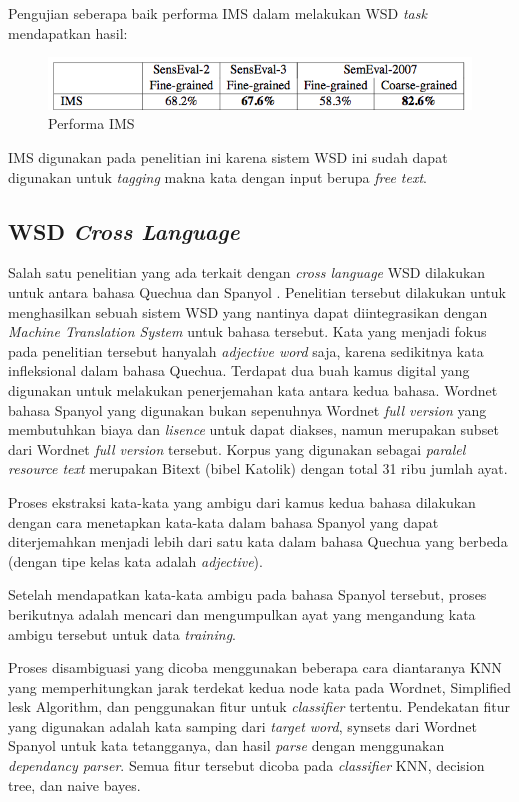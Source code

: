 Pengujian seberapa baik performa IMS dalam melakukan  WSD \textit{task} mendapatkan hasil:

\begin{figure}
	\centering
	\includegraphics[width=1\linewidth]{adit_pics/Performa-IMS}
	\caption{Performa IMS \citep{zhong2010makes}}
	\label{fig:Performa-IMS}
\end{figure}

IMS digunakan pada penelitian ini karena sistem WSD ini sudah dapat digunakan untuk \textit{tagging} makna kata dengan input berupa \textit{free text}.

\subsection{WSD \textit{Cross Language}}

Salah satu penelitian yang ada terkait dengan \textit{cross language} WSD dilakukan untuk antara bahasa Quechua dan Spanyol \citep{rudnick2011towards}. Penelitian tersebut dilakukan untuk menghasilkan sebuah sistem WSD yang nantinya dapat diintegrasikan dengan \textit{Machine Translation System} untuk bahasa tersebut. Kata yang menjadi fokus pada penelitian tersebut hanyalah \textit{adjective word} saja, karena sedikitnya kata infleksional dalam bahasa Quechua. Terdapat dua buah kamus digital yang digunakan untuk melakukan penerjemahan kata antara kedua bahasa. Wordnet bahasa Spanyol yang digunakan bukan sepenuhnya Wordnet \textit{full version} yang membutuhkan biaya dan \textit{lisence} untuk dapat diakses, namun merupakan subset dari Wordnet \textit{full version} tersebut. Korpus yang digunakan sebagai \textit{paralel resource text} merupakan Bitext (bibel Katolik) dengan total 31 ribu jumlah ayat.

Proses ekstraksi kata-kata yang ambigu dari kamus kedua bahasa dilakukan dengan cara menetapkan kata-kata dalam bahasa Spanyol yang dapat diterjemahkan menjadi lebih dari satu kata dalam bahasa Quechua yang berbeda (dengan tipe kelas kata adalah \textit{adjective}).

Setelah mendapatkan kata-kata ambigu pada bahasa Spanyol tersebut, proses berikutnya adalah mencari dan mengumpulkan ayat yang mengandung kata ambigu tersebut untuk data \textit{training}.

Proses disambiguasi yang dicoba menggunakan beberapa cara diantaranya KNN yang memperhitungkan jarak terdekat kedua node kata pada Wordnet, Simplified lesk Algorithm, dan penggunakan fitur untuk \textit{classifier} tertentu. Pendekatan fitur yang digunakan adalah kata samping dari \textit{target word}, synsets dari Wordnet Spanyol untuk kata tetangganya, dan hasil \textit{parse} dengan menggunakan \textit{dependancy parser}. Semua fitur tersebut dicoba pada \textit{classifier} KNN, decision tree, dan naive bayes.


